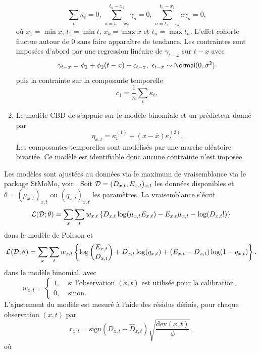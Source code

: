 \begin{ex}
\begin{enumerate}
  $$
\sum_{t}\kappa_t = 0\text{, }\sum_{a=t_1-x_k}^{t_n-x_1}\gamma_a=0\text{, }\sum_{a=t_1-x_k}^{t_n-x_1}a\gamma_a=0,
$$
où $x_1 = \min x$, $t_1=\min t$, $x_k = \max x$ et $t_n = \max t_n$. L'effet cohorte fluctue autour de $0$ sans faire apparaître de tendance. Les contraintes sont imposées d'abord par une regression linéaire de $\gamma_{t-x}$ sur $t-x$ avec 
$$
\gamma_{t-x} = \phi_1 + \phi_2(t-x) + \epsilon_{t-x},\text{ }\epsilon_{t-x}\sim\mathsf{Normal}(0,\sigma^2).
$$
puis la contrainte sur la composante temporelle
$$
c_1 = \frac{1}{n}\sum_t\kappa_t,
$$
\item Le modèle CBD de \citet{Cairns2006} s'appuie sur le modèle binomiale et un prédicteur donné par 
$$
\eta_{x,t} = \kappa_t^{(1)} + (x-\bar{x})\kappa_t^{(2)}.
$$
Les composantes temporelles sont modélisés par une marche aléatoire bivariée. Ce modèle est identifiable donc aucune contrainte n'est imposée.
\end{enumerate}
\end{ex}
Les modèles sont ajustées au données via le maximum de vraisemblance via le package StMoMo, voir \citet{Villegas2018}. Soit $\mathcal{D} = (D_{x,t}, E_{x,t})_{x,t}$ les données disponibles et $\theta = (\mu_{x,t})_{x,t}\text{ ou }(q_{x,t})_{x,t}$ les paramètres. La vraisemblance s'écrit 
$$
\mathcal{L}(\mathcal{D};\theta) = \sum_x\sum_t w_{x,t}\left\{D_{x,t}\log(\mu_{x,t}E_{x,t})-E_{x,t}\mu_{x,t}-\log(D_{x,t}!)\right\}
$$
dans le modèle de Poisson et 
$$
\mathcal{L}(\mathcal{D};\theta) = \sum_x\sum_t w_{x,t}\left\{\log\binom{E_{x,t}}{D_{x,t}} + D_{x,t}\log(q_{x,t}) + (E_{x,t} - D_{x,t})\log(1-q_{x,t})\right\}.
$$
dans le modèle binomial, avec 
$$
w_{x,t} = \begin{cases}
1,& \text{ si l'observation } (x,t)\text{ est utilisée pour la calibration},\\
0,& \text{ sinon.}
\end{cases}
$$
L'ajustement du modèle est mesuré à l'aide des résidus définis, pour chaque observation $(x,t)$ par 
$$
r_{x,t} = \text{sign}(D_{x,t} - \widehat{D}_{x,t})\sqrt{\frac{\text{dev}(x,t)}{\phi}},
$$
où 
